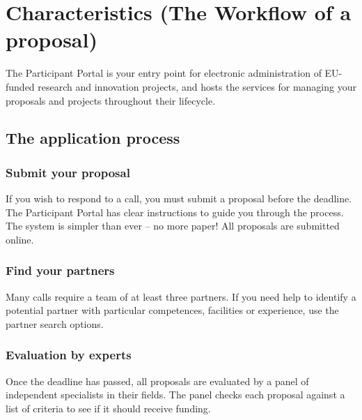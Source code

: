 \documentclass{article}
\begin{document}
\section{Characteristics (The Workflow of a proposal)}
The Participant Portal is your entry point for electronic administration of EU-funded research and innovation projects, and hosts the services for managing your proposals and projects throughout their lifecycle.

\subsection{The application process}

\subsubsection{Submit your proposal}
If you wish to respond to a call, you must submit a proposal before the deadline. The Participant Portal has clear instructions to guide you through the process. The system is simpler than ever – no more paper! All proposals are submitted online.

\subsubsection{Find your partners}
Many calls require a team of at least three partners. If you need help to identify a potential partner with particular competences, facilities or experience, use the partner search options.

\subsubsection{Evaluation by experts}
Once the deadline has passed, all proposals are evaluated by a panel of independent specialists in their fields. The panel checks each proposal against a list of criteria to see if it should receive funding.
\end{document}
